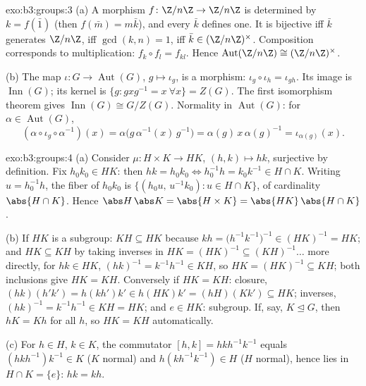 \begin{solution}{exo:b3:groups:3}
(a) A morphism $f \colon \Z/n\Z \to \Z/n\Z$ is determined by $k =
f(\bar 1)$ (then $f(\bar m) = m\bar k$), and every $\bar k$ defines
one. It is bijective iff $\bar k$ generates $\Z/n\Z$, iff
$\gcd(k,n) = 1$, iff $\bar k \in (\Z/n\Z)^\times$. Composition
corresponds to multiplication: $f_k \circ f_l = f_{kl}$. Hence
$\operatorname{Aut}(\Z/n\Z) \cong (\Z/n\Z)^\times$.

(b) The map $\iota\colon G \to \operatorname{Aut}(G)$, $g \mapsto
\iota_g$, is a morphism: $\iota_g \circ \iota_h = \iota_{gh}$. Its
image is $\operatorname{Inn}(G)$; its kernel is $\{g : gxg^{-1} =
x\ \forall x\} = Z(G)$. The first isomorphism theorem gives
$\operatorname{Inn}(G) \cong G/Z(G)$. Normality in
$\operatorname{Aut}(G)$: for $\alpha \in \operatorname{Aut}(G)$,
\[
(\alpha \circ \iota_g \circ \alpha^{-1})(x)
= \alpha\bigl(g\,\alpha^{-1}(x)\,g^{-1}\bigr)
= \alpha(g)\, x\, \alpha(g)^{-1} = \iota_{\alpha(g)}(x).
\]
\end{solution}

\begin{solution}{exo:b3:groups:4}
(a) Consider $\mu \colon H \times K \to HK$, $(h,k) \mapsto hk$,
surjective by definition. Fix $h_0k_0 \in HK$: then $hk = h_0k_0
\iff h_0^{-1}h = k_0 k^{-1} \in H \cap K$. Writing $u =
h_0^{-1}h$, the fiber of $h_0k_0$ is $\{(h_0u,\, u^{-1}k_0) : u
\in H \cap K\}$, of cardinality $\abs{H \cap K}$. Hence $\abs
H\,\abs K = \abs{H\times K} = \abs{HK}\,\abs{H \cap K}$.

(b) If $HK$ is a subgroup: $KH \subseteq HK$ because $kh =
\bigl(h^{-1}k^{-1}\bigr)^{-1} \in (HK)^{-1} = HK$; and $HK
\subseteq KH$ by taking inverses in $HK = (HK)^{-1} \subseteq
(KH)^{-1}\dots$ more directly, for $hk \in HK$, $(hk)^{-1} =
k^{-1}h^{-1} \in KH$, so $HK = (HK)^{-1} \subseteq KH$; both
inclusions give $HK = KH$. Conversely if $HK = KH$: closure,
$(hk)(h'k') = h(kh')k' \in h(HK)k' = (hH)(Kk') \subseteq HK$;
inverses, $(hk)^{-1} = k^{-1}h^{-1} \in KH = HK$; and $e \in HK$:
subgroup. If, say, $K \trianglelefteq G$, then $hK = Kh$ for all
$h$, so $HK = KH$ automatically.

(c) For $h \in H$, $k \in K$, the commutator $[h,k] = hkh^{-1}
k^{-1}$ equals $(hkh^{-1})k^{-1} \in K$ ($K$ normal) and
$h(kh^{-1}k^{-1}) \in H$ ($H$ normal), hence lies in $H \cap K =
\{e\}$: $hk = kh$.
\end{solution}

